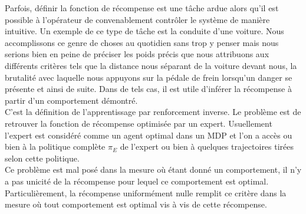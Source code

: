 \documentclass[publibook-draft]{CAp2012}
\begin{document}
Parfois, définir la fonction de récompense est une tâche ardue alors qu'il est possible à l'opérateur de convenablement contrôler le système de manière intuitive. Un exemple de ce type de tâche est la conduite d'une voiture. Nous accomplissons ce genre de choses au quotidien sans trop y penser mais nous serions bien en peine de préciser les poids précis que nous attribuons aux différents critères tels que la distance nous séparant de la voiture devant nous, la brutalité avec laquelle nous appuyons sur la pédale de frein lorsqu'un danger se présente et ainsi de suite. Dans de tels cas, il est utile d'inférer la récompense à partir d'un comportement démontré.\\

C'est la définition de l'apprentissage par renforcement inverse. Le problème est de retrouver la fonction de récompense optimisée par un expert. Usuellement l'expert est considéré comme un agent optimal dans un MDP et l'on a accès ou bien à la politique complète $\pi_E$ de l'expert ou bien à quelques trajectoires tirées selon cette politique.\\

Ce problème est mal posé dans la mesure où étant donné un comportement, il n'y a pas unicité de la récompense pour lequel ce comportement est optimal. Particulièrement, la récompense uniformément nulle remplit ce critère dans la mesure où tout comportement est optimal vis à vis de cette récompense.
\end{document}
